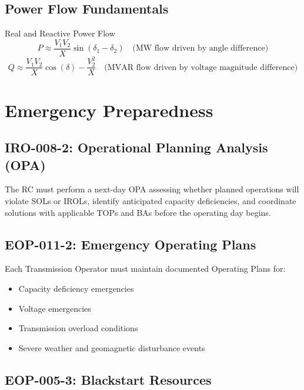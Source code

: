 \documentclass[12pt,twoside,openright]{memoir}
\begin{document}
\section{Power Flow Fundamentals}

\begin{formulabox}{Real and Reactive Power Flow}
\[
P \approx \frac{V_1 V_2}{X} \sin(\delta_1 - \delta_2) \quad \text{(MW flow driven by angle difference)}
\]
\[
Q \approx \frac{V_1 V_2}{X} \cos(\delta) - \frac{V_2^2}{X} \quad \text{(MVAR flow driven by voltage magnitude difference)}
\]
\end{formulabox}

\chapter{Emergency Preparedness}
\label{ch:emergencyprep}

\section{IRO-008-2: Operational Planning Analysis (OPA)}

The RC must perform a next-day OPA assessing whether planned operations will
violate SOLs or IROLs, identify anticipated capacity deficiencies, and coordinate
solutions with applicable TOPs and BAs before the operating day begins.

\section{EOP-011-2: Emergency Operating Plans}

Each Transmission Operator must maintain documented Operating Plans for:
\begin{itemize}
  \item Capacity deficiency emergencies
  \item Voltage emergencies
  \item Transmission overload conditions
  \item Severe weather and geomagnetic disturbance events
\end{itemize}

\section{EOP-005-3: Blackstart Resources}
\end{document}
